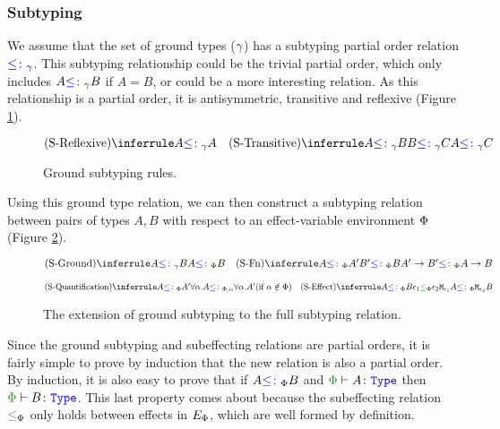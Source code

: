 \documentclass{Report}
\begin{document}
\subsubsection{Subtyping}

We assume that the set of ground types ($\g$) has a subtyping partial order relation $\subtype_{\ground}$. This subtyping relationship could be the trivial partial order, which only includes $A\subtypeg B$ if $A = B$, or could be a more interesting relation. As this relationship is a partial order, it is antisymmetric, transitive and reflexive (Figure \ref{GroundSubtyping}).

\begin{figure}[H]
    \centering
\begin{framed}
    \[
        \ntreerulez{\sreflexive}{A \subtype_{\ground} A}
        \quad
        \ntreeruleII{\stransitive}{A \subtype_{\ground} B}{B \subtype_{\ground} C}{A \subtype_{\ground} C}
    \]
\end{framed}
    \caption{Ground subtyping rules.}
    \label{GroundSubtyping}
\end{figure}
    

Using this ground type relation, we can then construct a subtyping relation between pairs of types $A, B$ with respect to an effect-variable environment $\P$ (Figure \ref{FullSubtypingDefinition}).

\begin{figure}[H]
    \centering

    \begin{framed}
    
\[
    \scalebox{0.85}{$
    \ntreeruleI{\sground}{A \subtype_{\ground} B}{A \subtypep B}
    \quad
    \ntreeruleII{\sfun}{A \subtypep A'}{B' \subtypep B }{\fntype{A'}{B'} \subtypep \ab}
    $}
    \]
    
    \[\scalebox{0.85}{$
    \condtreeruleI{\squant}{A\subtypep A'}{\all{\a}{A}\subtypepa\all{\a}{A'}}{\a\notin\P}
    \quad
    \ntreeruleII{\seffect}{A\subtypep B}{ \e_1\subeffectp\e_2}{\M{\e_1}{A}\subtypep\M{\e_2}{B}}
    $}
\]      
    \end{framed}
  

    \caption{The extension of ground subtyping to the full subtyping relation.}
    \label{FullSubtypingDefinition}
\end{figure}

Since the ground subtyping and subeffecting relations are partial orders, it is fairly simple to prove by induction that the new relation is also a partial order. By induction, it is also easy to prove that if $A \subtypep B$ and $\wellformedtype{\P}{A}$ then $\wellformedtype{\P}{B}$. This last property comes about because the subeffecting relation $\subeffectp$ only holds between effects in $E_\P$, which are well formed by definition.
\end{document}
